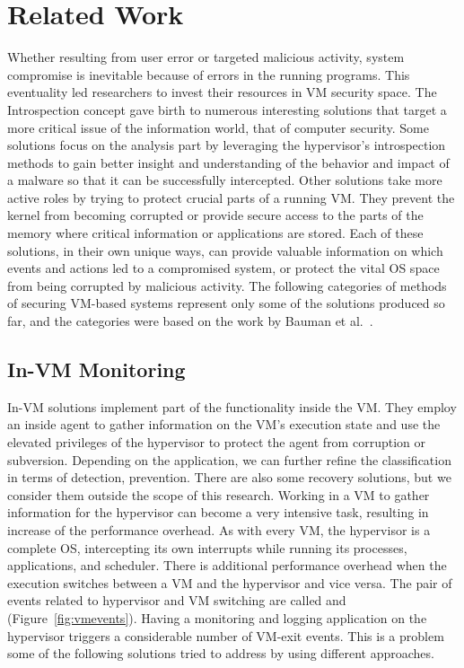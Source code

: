 \section{Related Work}\label{sec:related}

\par Whether resulting from user error or targeted malicious activity, system compromise is inevitable because of errors in the running programs. This eventuality led researchers to invest their resources in \ac{VM} security space. The Introspection concept gave birth to numerous interesting solutions that target a more critical issue of the information world, that of computer security. Some solutions focus on the analysis part by leveraging the hypervisor's introspection methods to gain better insight and understanding of the behavior and impact of a malware so that it can be successfully intercepted. Other solutions take more active roles by trying to protect crucial parts of a running \ac{VM}. They prevent the kernel from becoming corrupted or provide secure access to the parts of the memory where critical information or applications are stored. 
Each of these solutions, in their own unique ways, can provide valuable information on which events and actions led to a compromised system, or protect the vital \ac{OS} space from being corrupted by malicious activity. 
The following categories of methods of securing \ac{VM}-based systems represent only some of the solutions produced so far, and the categories were based on the work by Bauman et al.~\cite{bauman2015survey}.

\subsection{In-\ac{VM} Monitoring}\label{sub:invm}
In-\ac{VM} solutions implement part of the functionality inside the \ac{VM}. They employ an inside agent to gather information on the \ac{VM}'s execution state and use the elevated privileges of the hypervisor to protect the agent from corruption or subversion. Depending on the application, we can further refine the classification in terms of detection, prevention. There are also some recovery solutions, but we consider them outside the scope of this research. Working in a \ac{VM} to gather information for the hypervisor can become a very intensive task, resulting in increase of the performance overhead. As with every \ac{VM}, the hypervisor is a complete \ac{OS}, intercepting its own interrupts while running its processes, applications, and scheduler. There is additional performance overhead when the execution switches between a \ac{VM} and the hypervisor and vice versa. The pair of events related to hypervisor and \ac{VM} switching are called  and  (Figure~\ref{fig:vmevents}). Having a monitoring and logging application on the hypervisor triggers a considerable number of VM-exit events. This is a problem some of the following solutions tried to address by using different approaches.


